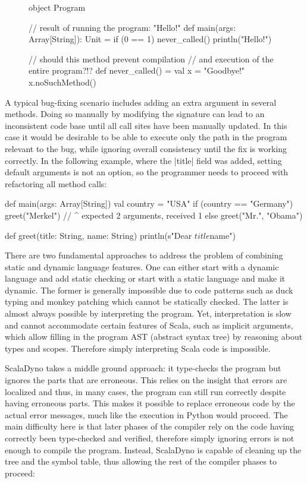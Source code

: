 \begin{figure}[h]
\begin{lstlisting-nobreak}
 object Program {
   // result of running the program: "Hello!"
   def main(args: Array[String]): Unit = {
     if (0 == 1)
       never_called()
     println("Hello!")
   }

   // should this method prevent compilation
   // and execution of the entire program?!?
   def never_called() = {
     val x = "Goodbye!"
     x.noSuchMethod()
   }
 }
\end{lstlisting-nobreak}
\vspace{-8mm}
\end{figure}

A typical bug-fixing scenario includes adding an extra argument in several methods. Doing so manually by modifying the signature can lead to an inconsistent code base until all call sites have been manually updated. In this case it would be desirable to be able to execute only the path in the program relevant to the bug, while ignoring overall consistency until the fix is working correctly. In the following example, where the |title| field was added, setting default arguments is not an option, so the programmer needs to proceed with refactoring all method calls:

\begin{lstlisting-nobreak}
 def main(args: Array[String]) {
   val country = "USA"
   if (country == "Germany") {
     greet("Merkel")
     //    ^ expected 2 arguments, received 1
   } else {
     greet("Mr.", "Obama")
   }
 }

 def greet(title: String, name: String) {
   println(s"Dear $title  $name")
 }
\end{lstlisting-nobreak}

There are two fundamental approaches to address the problem of combining static and dynamic language features. One can either start with a dynamic language and add static checking or start with a static language and make it dynamic. The former is generally impossible due to code patterns such as duck typing and monkey patching which cannot be statically checked. The latter is almost always possible by interpreting the program. Yet, interpretation is slow and cannot accommodate certain features of Scala, such as implicit arguments, which allow filling in the program AST (abstract syntax tree) by reasoning about types and scopes. Therefore simply interpreting Scala code is impossible.

ScalaDyno takes a middle ground approach: it type-checks the program but ignores the parts that are erroneous. This relies on the insight that errors are localized and thus, in many cases, the program can still run correctly despite having erroneous parts. This makes it possible to replace erroneous code by the actual error messages, much like the execution in Python would proceed. The main difficulty here is that later phases of the compiler rely on the code having correctly been type-checked and verified, therefore simply ignoring errors is not enough to compile the program. Instead, ScalaDyno is capable of cleaning up the tree and the symbol table, thus allowing the rest of the compiler phases to proceed:

